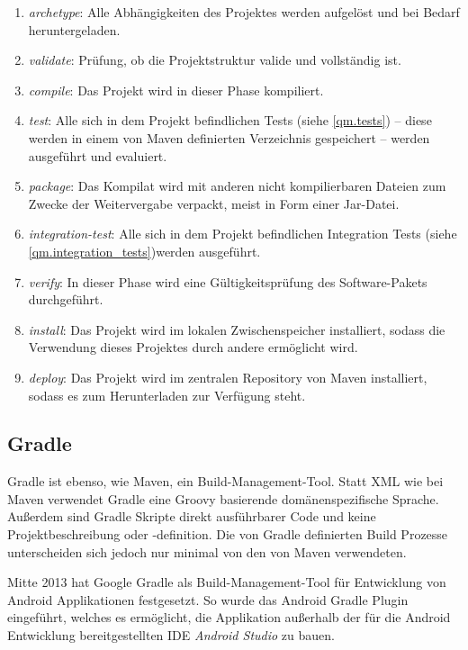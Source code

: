 			 \begin{enumerate}
			 	\item \textit{archetype}: Alle Abhängigkeiten des Projektes werden aufgelöst und bei Bedarf heruntergeladen.
			 	\item \textit{validate}: Prüfung, ob die Projektstruktur valide und vollständig ist.
			 	\item \textit{compile}: Das Projekt wird in dieser Phase kompiliert. 
			 	\item \textit{test}: Alle sich in dem Projekt befindlichen Tests (siehe \autoref{qm.tests}) -- diese werden in einem von Maven definierten Verzeichnis gespeichert -- werden ausgeführt und evaluiert.
			 	\item \textit{package}: Das Kompilat wird mit anderen nicht kompilierbaren Dateien zum Zwecke der Weitervergabe verpackt, meist in Form einer Jar-Datei.
			 	\item \textit{integration-test}: Alle sich in dem Projekt befindlichen Integration Tests (siehe \autoref{qm.integration_tests})werden ausgeführt. 
			 	\item \textit{verify}: In dieser Phase wird eine Gültigkeitsprüfung des Software-Pakets durchgeführt.
			 	\item \textit{install}: Das Projekt wird im lokalen Zwischenspeicher installiert, sodass die Verwendung dieses Projektes durch andere ermöglicht wird. 
			 	\item \textit{deploy}: Das Projekt wird im zentralen Repository von Maven installiert, sodass es zum Herunterladen zur Verfügung steht. 
			 \end{enumerate}
			 
		\subsection{Gradle} \label{sec:gradle}
			
			Gradle ist ebenso, wie Maven, ein Build-Management-Tool. Statt XML wie bei Maven verwendet Gradle eine Groovy basierende domänenspezifische Sprache. Außerdem sind Gradle Skripte direkt ausführbarer Code und keine Projektbeschreibung oder -definition. Die von Gradle definierten Build Prozesse unterscheiden sich jedoch nur minimal von den von Maven verwendeten. 
			
			\newpage
			
			Mitte 2013 hat Google Gradle als Build-Management-Tool für Entwicklung von Android Applikationen festgesetzt. So wurde das Android Gradle Plugin eingeführt, welches es ermöglicht, die Applikation außerhalb der für die Android Entwicklung bereitgestellten \acs{IDE} \textit{Android Studio} zu bauen. \cite{Google.2282020}
		
